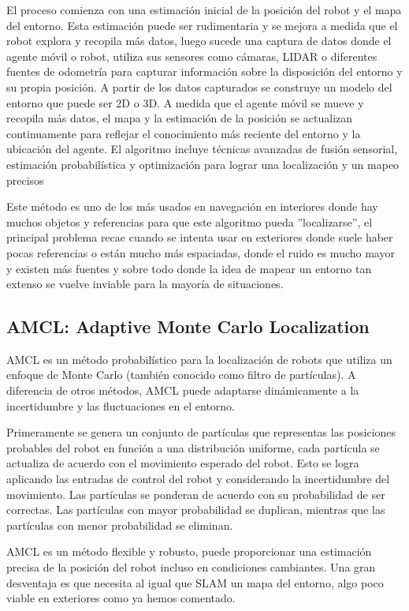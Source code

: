 El proceso comienza con una estimación inicial de la posición del robot y el mapa del entorno. Esta estimación puede ser rudimentaria y 
se mejora a medida que el robot explora y recopila más datos, luego sucede una captura de datos donde el agente móvil o robot, utiliza sus 
sensores como cámaras, LIDAR o diferentes fuentes de odometría para capturar información sobre la disposición del entorno y su propia 
posición. A partir de los datos capturados se construye un modelo del entorno que puede ser 2D o 3D. A medida que el agente móvil se mueve 
y recopila más datos, el mapa y la estimación de la posición se actualizan continuamente para reflejar el conocimiento más reciente del 
entorno y la ubicación del agente. El algoritmo incluye técnicas avanzadas de fusión sensorial, estimación probabilística y optimización 
para lograr una localización y un mapeo precisos

Este método es uno de los más usados en navegación en interiores donde hay muchos objetos y referencias para que este algoritmo pueda 
''localizarse'', el principal problema recae cuando se intenta usar en exteriores donde suele haber pocas referencias o están mucho más 
espaciadas, donde el ruido es mucho mayor y existen más fuentes y sobre todo donde la idea de mapear un entorno tan extenso se vuelve 
inviable para la mayoría de situaciones.

\subsection{AMCL: Adaptive Monte Carlo Localization}

AMCL es un método probabilístico para la localización de robots que utiliza un enfoque de Monte Carlo (también conocido como filtro de 
partículas). A diferencia de otros métodos, AMCL puede adaptarse dinámicamente a la incertidumbre y las fluctuaciones en el entorno. 

Primeramente se genera un conjunto de partículas que representas las posiciones probables del robot en función a una distribución uniforme, 
cada partícula se actualiza de acuerdo con el movimiento esperado del robot. Esto se logra aplicando las entradas de control del robot y 
considerando la incertidumbre del movimiento. Las partículas se ponderan de acuerdo con su probabilidad de ser correctas. Las partículas 
con mayor probabilidad se duplican, mientras que las partículas con menor probabilidad se eliminan. 

AMCL es un método flexible y robusto, puede proporcionar una estimación precisa de la posición del robot incluso en condiciones cambiantes. 
Una gran desventaja es que necesita al igual que SLAM un mapa del entorno, algo poco viable en exteriores como ya hemos comentado.

